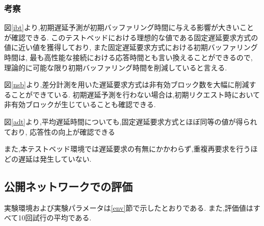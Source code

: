 \documentclass[a4j,12pt]{gradthesis_utf8}
\begin{document}
\clearpage

\subsubsection{考察}
図\ref{ibt}より,初期遅延予測が初期バッファリング時間に与える影響が大きいことが確認できる.
このテストベッドにおける理想的な値である固定遅延要求方式の値に近い値を獲得しており,
また固定遅延要求方式における初期バッファリング時間は,
最も高性能な接続における応答時間とも言い換えることができるので,
理論的に可能な限り初期バッファリング時間を削減していると言える.

図\ref{nsb}より,差分計測を用いた遅延要求方式は非有効ブロック数を大幅に削減することができている.
初期遅延予測を行わない場合は,初期リクエスト時において非有効ブロックが生じていることも確認できる.

図\ref{adt}より,平均遅延時間についても,固定遅延要求方式とほぼ同等の値が得られており,
応答性の向上が確認できる

また,本テストベッド環境では遅延要求の有無にかかわらず,重複再要求を行うほどの遅延は発生していない.
\clearpage

\subsection{公開ネットワークでの評価}
実験環境および実験パラメータは\ref{env}節で示したとおりである.
また,評価値はすべて10回試行の平均である.
\end{document}

